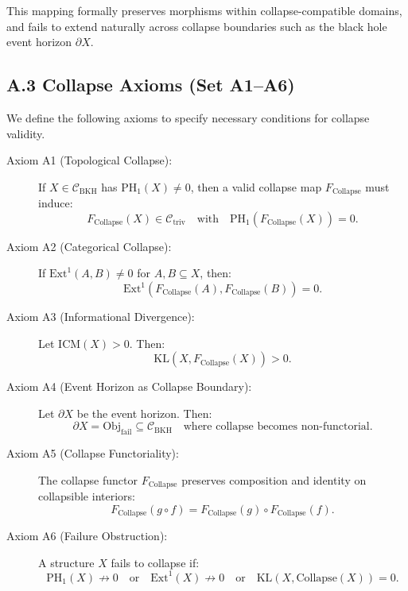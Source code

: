 \documentclass[11pt]{article}
\begin{document}
This mapping formally preserves morphisms within collapse-compatible domains, and fails to extend naturally across collapse boundaries such as the black hole event horizon \( \partial X \).


\subsection*{A.3 Collapse Axioms (Set A1–A6)}

We define the following axioms to specify necessary conditions for collapse validity.

\begin{description}
    \item[Axiom A1 (Topological Collapse):] If \( X \in \mathcal{C}_{\mathrm{BKH}} \) has \( \mathrm{PH}_1(X) \neq 0 \), then a valid collapse map \( F_{\mathrm{Collapse}} \) must induce:
    \[
    F_{\mathrm{Collapse}}(X) \in \mathcal{C}_{\mathrm{triv}} \quad \text{with} \quad \mathrm{PH}_1(F_{\mathrm{Collapse}}(X)) = 0.
    \]

    \item[Axiom A2 (Categorical Collapse):] If \( \mathrm{Ext}^1(A, B) \neq 0 \) for \( A, B \subseteq X \), then:
    \[
    \mathrm{Ext}^1(F_{\mathrm{Collapse}}(A), F_{\mathrm{Collapse}}(B)) = 0.
    \]

    \item[Axiom A3 (Informational Divergence):] Let \( \mathrm{ICM}(X) > 0 \). Then:
    \[
    \mathrm{KL}(X, F_{\mathrm{Collapse}}(X)) > 0.
    \]

    \item[Axiom A4 (Event Horizon as Collapse Boundary):] Let \( \partial X \) be the event horizon. Then:
    \[
    \partial X = \text{Obj}_{\mathrm{fail}} \subseteq \mathcal{C}_{\mathrm{BKH}} \quad \text{where collapse becomes non-functorial.}
    \]

    \item[Axiom A5 (Collapse Functoriality):] The collapse functor \( F_{\mathrm{Collapse}} \) preserves composition and identity on collapsible interiors:
    \[
    F_{\mathrm{Collapse}}(g \circ f) = F_{\mathrm{Collapse}}(g) \circ F_{\mathrm{Collapse}}(f).
    \]

    \item[Axiom A6 (Failure Obstruction):] A structure \( X \) fails to collapse if:
    \[
    \mathrm{PH}_1(X) \not\rightarrow 0 \quad \text{or} \quad \mathrm{Ext}^1(X) \not\rightarrow 0 \quad \text{or} \quad \mathrm{KL}(X, \mathrm{Collapse}(X)) = 0.
    \]
\end{description}
\end{document}

